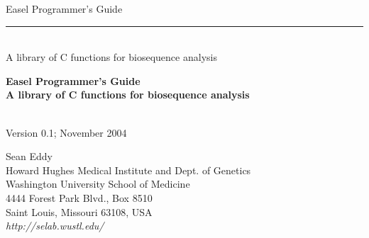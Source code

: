 \begin{titlepage}
{\Large

\vspace*{\fill}

\begin{latexonly}
\noindent
{\Huge \textsf{Easel Programmer's Guide}} \\ 
\rule[2pt]{\textwidth}{1pt} \\
\hspace*{\fill} {\large \textsf{A library of C functions for
    biosequence analysis} \\ }
\end{latexonly}

\begin{htmlonly}
\begin{center}
{\Huge \textbf{Easel Programmer's Guide}}\\
{\large \textbf{A library of C functions for biosequence analysis}}\\
\end{center}
\end{htmlonly}

\vspace*{\fill}

\begin{center}
\textsl{}\\
Version 0.1; November 2004 \\ 

\vspace*{\fill}

Sean Eddy\\
Howard Hughes Medical Institute and Dept. of Genetics\\
Washington University School of Medicine\\
4444 Forest Park Blvd., Box 8510\\
Saint Louis, Missouri 63108, USA\\
\textsl{http://selab.wustl.edu/} \\
\end{center}

\vspace*{\fill}
}
\end{titlepage}
